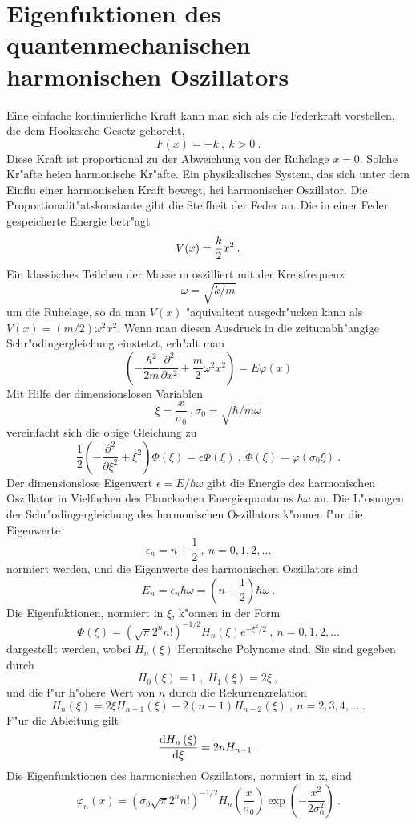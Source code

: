 \documentclass[11pt,twoside]{report}
\begin{document}
\section{Eigenfuktionen des quantenmechanischen harmonischen Oszillators}
Eine einfache kontinuierliche Kraft kann man sich als die Federkraft vorstellen, die dem Hookesche Gesetz gehorcht,
$$F(x)=-k \: , \: k>0 \: .$$
Diese Kraft ist proportional zu der Abweichung von der Ruhelage $x=0$. Solche Kr"afte hei\3en harmonische Kr"afte. Ein physikalisches System, das sich unter dem Einflu\3 einer harmonischen Kraft bewegt, hei\3 harmonischer Oszillator. Die Proportionalit"atskonstante gibt die Steifheit der Feder an. Die in einer Feder gespeicherte Energie betr"agt
$$ V(x)={k \over 2}x^2 \: .$$
Ein klassisches Teilchen der Masse m oszilliert mit der Kreisfrequenz
$$ \omega = \sqrt{k/m} $$
um die Ruhelage, so da\3 man $V(x)$ "aquivaltent ausgedr"ucken kann als $V(x)=(m/2)\omega^2 x^2$. Wenn man diesen Ausdruck in die zeitunabh"angige Schr"odingergleichung einstetzt, erh"alt man
$$ \left( -\frac{\hbar^2}{2m}\frac{\partial^2}{\partial x^2}+\frac{m}{2}\omega^2  x^2 \right) = E\varphi\left( x \right) $$
Mit Hilfe der dimensionslosen Variablen 
$$ \xi = \frac{x}{\sigma_0} \: , \sigma_0 = \sqrt{\hbar / m\omega} $$
vereinfacht sich die obige Gleichung zu
$$ \frac{1}{2}\left(-\frac{\partial^2}{\partial \xi^2} + \xi^2 \right)\Phi\left( \xi \right) =  \epsilon\Phi \left(\xi\right) \: , \: \Phi\left( \xi \right)=\varphi\left(\sigma_0\xi\right) \: .$$
Der dimensionslose Eigenwert $\epsilon = E/\hbar\omega$ gibt die Energie des harmonischen Oszillator in Vielfachen des Planckschen Energiequantums $\hbar\omega$ an. Die L"osungen der Schr"odingergleichung des harmonischen Oszillators k"onnen f"ur die Eigenwerte
$$ \epsilon_n = n + \frac{1}{2} \:, \: n=0, 1,2, \ldots $$
normiert werden, und die Eigenwerte des harmonischen Oszillators sind 
$$ E_n = \epsilon_n\hbar\omega = \left( n+\frac{1}{2} \right)\hbar\omega \: .$$
Die Eigenfuktionen, normiert in $\xi$, k"onnen in der Form
$$ \Phi\left(\xi\right) = \left(\sqrt{\pi}2^n n!\right)^{-1/2}H_n \left(\xi\right)e^{-\xi^2/2} \: , \: n=0, 1, 2,\ldots$$
dargestellt werden, wobei $H_n\left(\xi\right)$ Hermitsche Polynome sind. Sie sind gegeben durch
$$ H_0\left(\xi\right)=1 \; , \; H_1\left(\xi\right) = 2\xi \: ,$$
und die f"ur h"ohere Wert von $n$ durch die Rekurrenzrelation
$$ H_n\left(\xi\right)=2\xi H_{n-1}\left(\xi\right) -2\left( n-1\right) H_{n-2}\left(\xi\right) \: , \: n=2, 3, 4,\ldots \: .$$
F"ur die Ableitung gilt
$$ {\mbox{d} H_n \left( \xi \right) \over \mbox{d} \xi} = 2n H_{n-1} \: .$$
Die Eigenfunktionen des harmonischen Oszillators, normiert in x, sind
$$ \varphi_n\left(x\right)=\left(\sigma_0\sqrt{\pi}2^n n!\right)^{-1/2}H_n\left(\frac{x}{\sigma_0}\right)\exp\left( -\frac{x^2}{2\sigma_0^2}\right) \: .$$
\end{document}
